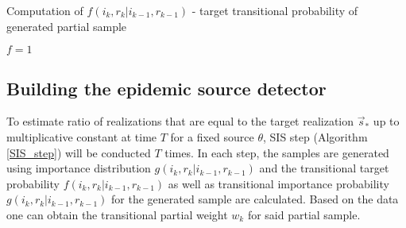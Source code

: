 \documentclass[times, utf8, diplomski]{fer}
\begin{document}
\vspace{5mm}
\begin{algorithm}[H]
\caption{Computation of  $f(i_k, r_k | i_{k - 1}, r_{k - 1})$ - target transitional probability of generated partial sample}
\label{target_trans}
$f = 1$\\
\end{algorithm}
\vspace{5mm}

\subsection{Building the epidemic source detector}

To estimate ratio of realizations that are equal to the target realization $\vec s_*$ up to multiplicative constant at time $T$ for a fixed source $\theta$, SIS step (Algorithm \ref{SIS_step}) will be conducted $T$ times. In each step, the samples are generated using importance distribution $g(i_{k}, r_{k} | i_{k - 1}, r_{k - 1})$ and the transitional target probability $f(i_{k}, r_{k} | i_{k - 1}, r_{k - 1})$ as well as transitional importance probability $g(i_{k}, r_{k} | i_{k - 1}, r_{k - 1})$ for the generated sample are calculated. Based on the data one can obtain the transitional partial weight $w_k$ for said partial sample.
\end{document}
